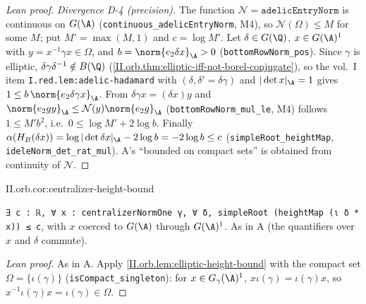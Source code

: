 \begin{proof}[Lean proof]
\emph{Divergence D-4 (precision).} The function $\mathcal N=\texttt{adelicEntryNorm}$ is continuous on $G(\A)$ (\texttt{continuous\_adelicEntryNorm}, M4), so $\mathcal N(\Omega)\le M$ for some $M$; put $M'=\max(M,1)$ and $c=\log M'$. Let $\delta\in G(\Q)$, $x\in G(\A)^1$ with $y=x^{-1}\gamma x\in\Omega$, and $b=\norm{e_2\delta x}_\A>0$ (\texttt{bottomRowNorm\_pos}). Since $\gamma$ is elliptic, $\delta\gamma\delta^{-1}\notin B(\Q)$ (\cref{II.orb.thm:elliptic-iff-not-borel-conjugate}), so the vol.~I item \texttt{I.red.lem:adelic-hadamard} with $(\delta,\delta'=\delta\gamma)$ and $|\det x|_\A=1$ gives $1\le b\,\norm{e_2\delta\gamma x}_\A$. From $\delta\gamma x=(\delta x)y$ and $\norm{e_2gy}_\A\le\mathcal N(y)\norm{e_2g}_\A$ (\texttt{bottomRowNorm\_mul\_le}, M4) follows $1\le M'b^2$, i.e.\ $0\le\log M'+2\log b$. Finally $\alpha(H_B(\delta x))=\log|\det\delta x|_\A-2\log b=-2\log b\le c$ (\texttt{simpleRoot\_heightMap}, \texttt{ideleNorm\_det\_rat\_mul}). A's ``bounded on compact sets'' is obtained from continuity of $\mathcal N$.
\end{proof}

\begin{corollary}
\end{corollary}
\begin{tfformal}{II.orb.cor:centralizer-height-bound}
\begin{tffidelity}
\texttt{∃ c : ℝ, ∀ x : centralizerNormOne γ, ∀ δ, simpleRoot (heightMap (ι δ * x)) ≤ c}, with $x$ coerced to $G(\A)$ through $G(\A)^1$. As in A (the quantifiers over $x$ and $\delta$ commute).
\end{tffidelity}
\end{tfformal}
\begin{proof}[Lean proof]
As in A. Apply \cref{II.orb.lem:elliptic-height-bound} with the compact set $\Omega=\{\iota(\gamma)\}$ (\texttt{isCompact\_singleton}): for $x\in G_\gamma(\A)^1$, $x\iota(\gamma)=\iota(\gamma)x$, so $x^{-1}\iota(\gamma)x=\iota(\gamma)\in\Omega$.
\end{proof}

